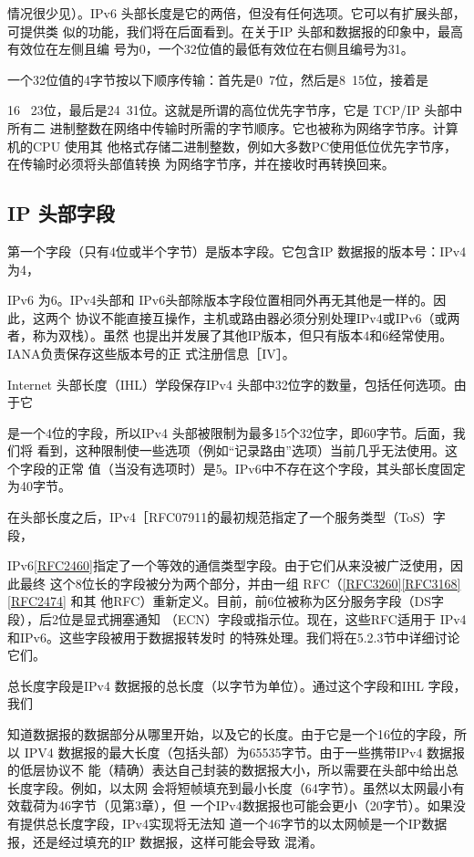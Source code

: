 情况很少见）。IPv6 头部长度是它的两倍，但没有任何选项。它可以有扩展头部，可提供类
似的功能，我们将在后面看到。在关于IP 头部和数据报的印象中，最高有效位在左侧且编
号为0，一个32位值的最低有效位在右侧且编号为31。

一个32位值的4字节按以下顺序传输：首先是0~7位，然后是8~15位，接着是

16 ~23位，最后是24~31位。这就是所谓的高位优先字节序，它是 TCP/IP 头部中所有二
进制整数在网络中传输时所需的字节顺序。它也被称为网络字节序。计算机的CPU 使用其
他格式存储二进制整数，例如大多数PC使用低位优先字节序，在传输时必须将头部值转换
为网络字节序，并在接收时再转换回来。

\subsection{IP 头部字段}
第一个字段（只有4位或半个字节）是版本字段。它包含IP 数据报的版本号：IPv4 为4，

IPv6 为6。IPv4头部和 IPv6头部除版本字段位置相同外再无其他是一样的。因此，这两个
协议不能直接互操作，主机或路由器必须分别处理IPv4或IPv6（或两者，称为双栈）。虽然
也提出并发展了其他IP版本，但只有版本4和6经常使用。IANA负责保存这些版本号的正
式注册信息［IV］。

Internet 头部长度（IHL）学段保存IPv4 头部中32位字的数量，包括任何选项。由于它

是一个4位的字段，所以IPv4 头部被限制为最多15个32位字，即60字节。后面，我们将
看到，这种限制使一些选项（例如“记录路由”选项）当前几乎无法使用。这个字段的正常
值（当没有选项时）是5。IPv6中不存在这个字段，其头部长度固定为40字节。

在头部长度之后，IPv4［RFC07911的最初规范指定了一个服务类型（ToS）字段，

IPv6\href{https://www.rfc-editor.org/rfc/rfc2460}{[RFC2460]}指定了一个等效的通信类型字段。由于它们从来没被广泛使用，因此最终
这个8位长的字段被分为两个部分，并由一组 RFC（\href{https://www.rfc-editor.org/rfc/rfc3260}{[RFC3260]}\href{https://www.rfc-editor.org/rfc/rfc3168}{[RFC3168]}\href{https://www.rfc-editor.org/rfc/rfc2474}{[RFC2474]} 和其
他RFC）重新定义。目前，前6位被称为区分服务字段（DS字段），后2位是显式拥塞通知
（ECN）字段或指示位。现在，这些RFC适用于 IPv4和IPv6。这些字段被用于数据报转发时
的特殊处理。我们将在5.2.3节中详细讨论它们。

总长度字段是IPv4 数据报的总长度（以字节为单位）。通过这个字段和IHL 字段，我们

知道数据报的数据部分从哪里开始，以及它的长度。由于它是一个16位的字段，所以 IPV4
数据报的最大长度（包括头部）为65535字节。由于一些携带IPv4 数据报的低层协议不
能（精确）表达自己封装的数据报大小，所以需要在头部中给出总长度字段。例如，以太网
会将短帧填充到最小长度（64字节）。虽然以太网最小有效载荷为46字节（见第3章），但
一个IPv4数据报也可能会更小（20字节）。如果没有提供总长度字段，IPv4实现将无法知
道一个46字节的以太网帧是一个IP数据报，还是经过填充的IP 数据报，这样可能会导致
混淆。


